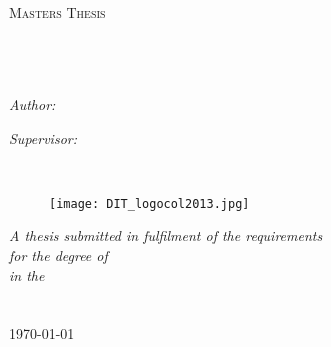 \documentclass[11pt, oneside]{Thesis} %
\begin{document}
	\begin{titlepage}
		\begin{center}
			
			\textsc{\LARGE \univname}\\[1.5cm] %
			\textsc{\Large Masters Thesis}\\[0.5cm] %
			
			\HRule \\[0.4cm] %
			{\huge \bfseries \ttitle}\\[0.4cm] %
			\HRule \\[1.5cm] %
			
			\begin{minipage}{0.4\textwidth}
				\begin{flushleft} \large
					\emph{Author:}\\
					{\authornames} %
				\end{flushleft}
			\end{minipage}
			\begin{minipage}{0.4\textwidth}
				\begin{flushright} \large
					\emph{Supervisor:} \\
					\supname %
				\end{flushright}
			\end{minipage}\\
			
			\begin{figure}[H]
				\texttt{[image: DIT\_logocol2013.jpg]}
				\label{fig:DIT_logocol2013}
			\end{figure}
			
			\large \textit{A thesis submitted in fulfilment of the requirements\\ for the degree of \degreename}\\[0.3cm] %
			\textit{in the}\\[0.4cm]
			\facname\\\deptname\\[2cm] %
			
			{\large \today}\\[4cm] %
			
			\vfill
		\end{center}
		
	\end{titlepage}
	
\end{document}
